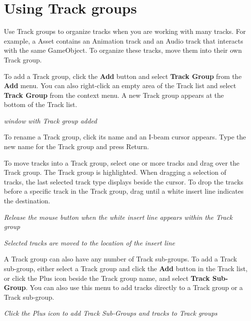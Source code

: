 \chapter{Using Track groups}
\hypertarget{md__library_2_package_cache_2com_8unity_8timeline_0d1_87_86_2_documentation_0i_2grp__use}{}\label{md__library_2_package_cache_2com_8unity_8timeline_0d1_87_86_2_documentation_0i_2grp__use}
\label{md__library_2_package_cache_2com_8unity_8timeline_0d1_87_86_2_documentation_0i_2grp__use_autotoc_md1144}%
%
 Use Track groups to organize tracks when you are working with many tracks. For example, a  Asset contains an Animation track and an Audio track that interacts with the same Game\+Object. To organize these tracks, move them into their own Track group.

To add a Track group, click the {\bfseries{Add}} button and select {\bfseries{Track Group}} from the {\bfseries{Add}} menu. You can also right-\/click an empty area of the Track list and select {\bfseries{Track Group}} from the context menu. A new Track group appears at the bottom of the Track list.



{\itshape {} window with Track group added}

To rename a Track group, click its name and an I-\/beam cursor appears. Type the new name for the Track group and press Return.

To move tracks into a Track group, select one or more tracks and drag over the Track group. The Track group is highlighted. When dragging a selection of tracks, the last selected track type displays beside the cursor. To drop the tracks before a specific track in the Track group, drag until a white insert line indicates the destination.



{\itshape Release the mouse button when the white insert line appears within the Track group}



{\itshape Selected tracks are moved to the location of the insert line}

A Track group can also have any number of Track sub-\/groups. To add a Track sub-\/group, either select a Track group and click the {\bfseries{Add}} button in the Track list, or click the Plus icon beside the Track group name, and select {\bfseries{Track Sub-\/\+Group}}. You can also use this menu to add tracks directly to a Track group or a Track sub-\/group.



{\itshape Click the Plus icon to add Track Sub-\/\+Groups and tracks to Track groups} 